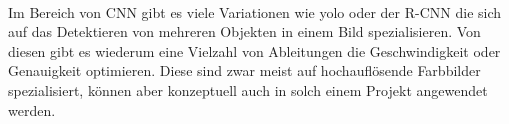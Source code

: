 \\
Im Bereich von \gls{CNN} gibt es viele Variationen wie \gls{yolo} oder der \gls{R-CNN} \parencite{yoloRCnn} die sich auf das Detektieren von mehreren Objekten in einem Bild spezialisieren. Von diesen gibt es wiederum eine Vielzahl von Ableitungen die Geschwindigkeit oder Genauigkeit optimieren. Diese sind zwar meist auf hochauflösende Farbbilder spezialisiert, können aber konzeptuell auch in solch einem Projekt angewendet werden.

